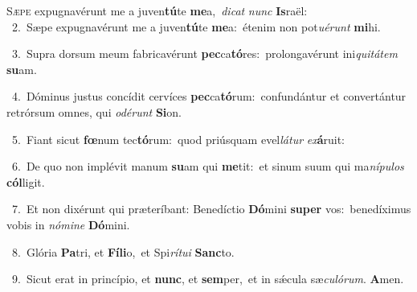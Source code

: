 \lettrine{\initial\textcolor{\initialcolor}{S}}{æpe} expugnavérunt me a juven\-\textbf{tú}\-te \textbf{me}\-a,~\star \textit{di}\-\textit{cat} \textit{nunc} \textbf{Is}\-raël:\\
{\numbfont\textcolor{\numbcolor}{~2.}}~Sæpe expugnavérunt me a juven\-\textbf{tú}\-te \textbf{me}\-a:~\star étenim non pot\-\textit{u}\-\textit{é}\textit{runt} \textbf{mi}\-hi.\par
{\numbfont\textcolor{\numbcolor}{~3.}}~Supra dorsum meum fabricavérunt \textbf{pec}\-ca\-\textbf{tó}\-res:~\star prolongavérunt ini\-\textit{qui}\-\textit{tá}\textit{tem} \textbf{su}\-am.\par
{\numbfont\textcolor{\numbcolor}{~4.}}~Dóminus justus concídit cervíces \textbf{pec}\-ca\-\textbf{tó}\-rum:~\star confundántur et convertántur retrórsum omnes, qui \textit{o}\-\textit{dé}\textit{runt} \textbf{Si}\-on.\par
{\numbfont\textcolor{\numbcolor}{~5.}}~Fiant sicut \textbf{fœ}\-num tec\-\textbf{tó}\-rum:~\star quod priúsquam evel\-\textit{lá}\-\textit{tur} \textit{ex}\-\textbf{á}ruit:\par
{\numbfont\textcolor{\numbcolor}{~6.}}~De quo non implévit manum \textbf{su}\-am qui \textbf{me}\-tit:~\star et sinum suum qui ma\-\textit{ní}\-\textit{pu}\textit{los} \textbf{cól}\-ligit.\par
{\numbfont\textcolor{\numbcolor}{~7.}}~Et non dixérunt qui præteríbant: Benedíctio \textbf{Dó}\-mini \textbf{su}\-\textbf{per} vos:~\star benedíximus vobis in \textit{nó}\-\textit{mi}\textit{ne} \textbf{Dó}\-mini.\par
{\numbfont\textcolor{\numbcolor}{~8.}}~Glória \textbf{Pa}\-tri, et \textbf{Fí}\-\textbf{li}o,~\star et Spi\-\textit{rí}\-\textit{tu}\textit{i} \textbf{Sanc}\-to.\par
{\numbfont\textcolor{\numbcolor}{~9.}}~Sicut erat in princípio, et \textbf{nunc}\-, et \textbf{sem}\-per,~\star et in sǽcula sæ\-\textit{cu}\-\textit{ló}\textit{rum}. \textbf{A}\-men.\par
